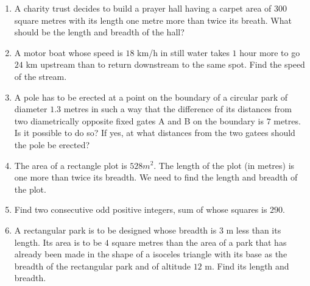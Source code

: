 \begin{enumerate}[label=\thesubsection.\arabic*,ref=\thesubsection.\theenumi,resume*]
\item  A charity trust decides to build a prayer hall having a carpet area of 300 square metres with its length one metre more than twice its breath. What should be the length and breadth of the hall?
\item A motor boat whose speed is $18$ km/h in still water takes $1$ hour more to go $24$ km upstream than to return downstream to the same spot. Find the speed of the stream.
\item A pole has to be erected at a point on the boundary of a circular park of diameter $1.3$ metres in such a way that the difference of its distances from two diametrically opposite fixed gates A and B on the boundary is $7$ metres. Is it possible to do so? If yes, at what distances from the two gatees should the pole be erected?
\item The area of a rectangle plot is $528 m^2$. The length of the plot (in metres) is one more than twice its breadth. We need to find the length and breadth of the plot.
\item Find two consecutive odd positive integers, sum of whose squares is $290$.
\item A rectangular park is to be designed whose breadth is $3$ m less than its length. Its area is to be $4$ square metres than the area of a park that has already been made in the shape of a isoceles triangle with its base as  the breadth of the rectangular park and of altitude $12$ m. Find its length and breadth.
\end{enumerate}
